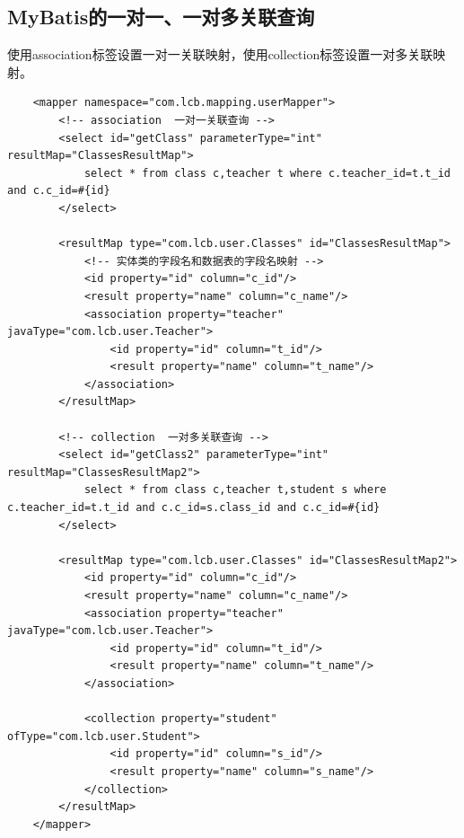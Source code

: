 \documentclass[main.tex]{subfiles}
\begin{document}
\subsection{MyBatis的一对一、一对多关联查询}
使用association标签设置一对一关联映射，使用collection标签设置一对多关联映射。
\begin{verbatim}
    <mapper namespace="com.lcb.mapping.userMapper">
        <!-- association  一对一关联查询 -->
        <select id="getClass" parameterType="int" resultMap="ClassesResultMap">
            select * from class c,teacher t where c.teacher_id=t.t_id and c.c_id=#{id}
        </select>

        <resultMap type="com.lcb.user.Classes" id="ClassesResultMap">
            <!-- 实体类的字段名和数据表的字段名映射 -->
            <id property="id" column="c_id"/>
            <result property="name" column="c_name"/>
            <association property="teacher" javaType="com.lcb.user.Teacher">
                <id property="id" column="t_id"/>
                <result property="name" column="t_name"/>
            </association>
        </resultMap>

        <!-- collection  一对多关联查询 -->
        <select id="getClass2" parameterType="int" resultMap="ClassesResultMap2">
            select * from class c,teacher t,student s where c.teacher_id=t.t_id and c.c_id=s.class_id and c.c_id=#{id}
        </select>

        <resultMap type="com.lcb.user.Classes" id="ClassesResultMap2">
            <id property="id" column="c_id"/>
            <result property="name" column="c_name"/>
            <association property="teacher" javaType="com.lcb.user.Teacher">
                <id property="id" column="t_id"/>
                <result property="name" column="t_name"/>
            </association>

            <collection property="student" ofType="com.lcb.user.Student">
                <id property="id" column="s_id"/>
                <result property="name" column="s_name"/>
            </collection>
        </resultMap>
    </mapper>
\end{verbatim}
\end{document}
